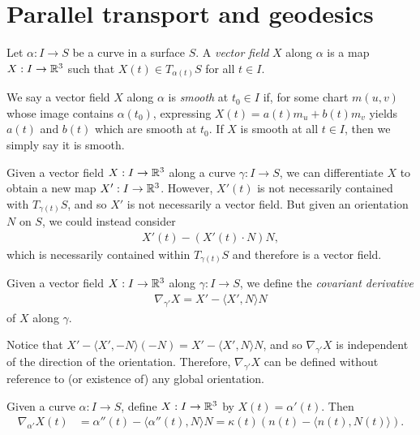 \section{Parallel transport and geodesics}

\begin{defn}
    Let $\alpha: I \to S$ be a curve in a surface $S$. A \emph{vector field} $X$ along $\alpha$ is a map $X: I \to \mathbb{R}^3$ such that $X(t) \in T_{\alpha(t)}S$ for all $t \in I$.

    We say a vector field $X$ along $\alpha$ is \emph{smooth} at $t_0 \in I$ if, for some chart $m(u, v)$ whose image contains $\alpha(t_0)$, expressing $X(t) = a(t)m_u + b(t)m_v$ yields $a(t)$ and $b(t)$ which are smooth at $t_0$. If $X$ is smooth at all $t \in I$, then we simply say it is smooth.
\end{defn}

\begin{rmk}
    Given a vector field $X: I \to \mathbb{R}^3$ along a curve $\gamma: I \to S$, we can differentiate $X$ to obtain a new map $X': I \to \mathbb{R}^3$. However, $X'(t)$ is not necessarily contained with $T_{\gamma(t)}S$, and so $X'$ is not necessarily a vector field. But given an orientation $N$ on $S$, we could instead consider
    \begin{align*}
        X'(t) - \left(X'(t) \cdot N\right)N,
    \end{align*}
    which is necessarily contained within $T_{\gamma(t)}S$ and therefore is a vector field.
\end{rmk}

\begin{defn}
    Given a vector field $X: I \to \mathbb{R}^3$ along $\gamma: I \to S$, we define the \emph{covariant derivative}
    \begin{align*}
        \nabla_{\gamma'} X = X' - \langle X', N\rangle N
    \end{align*}
    of $X$ along $\gamma$.
\end{defn}

\begin{rmk}
    Notice that $X' - \langle X', -N\rangle(-N) = X' - \langle X', N\rangle N$, and so $\nabla_{\gamma'}X$ is independent of the direction of the orientation. Therefore, $\nabla_{\gamma'}X$ can be defined without reference to (or existence of) any global orientation.
\end{rmk}

\begin{exmp}
    Given a curve $\alpha: I \to S$, define $X: I \to \mathbb{R}^3$ by $X(t) = \alpha'(t)$. Then
    \begin{align*}
        \nabla_{\alpha'}X(t) &= \alpha''(t) - \langle \alpha''(t), N\rangle N = \kappa(t)\left(n(t)-\langle n(t), N(t)\rangle\right).
    \end{align*}
\end{exmp}

